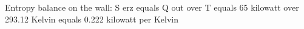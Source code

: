 Entropy balance on the wall:
S erz equals Q out over T equals 65 kilowatt over 293.12 Kelvin equals 0.222 kilowatt per Kelvin